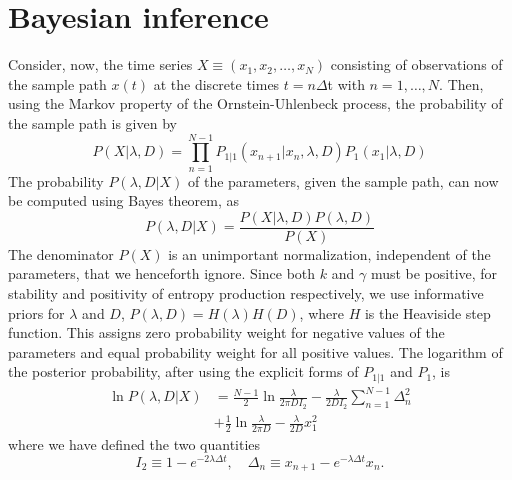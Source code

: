 \documentclass[english,aps, onecolumn, prl,superscriptaddress, notitlepage]{revtex4-1}
\begin{document}
\section{Bayesian inference\label{sec:Bayesian-inference}}

Consider, now, the time series $X\equiv(x_{1},x_{2},\ldots,x_{N})$
consisting of observations of the sample path $x(t)$ at the discrete
times $t=n\Delta$t with $n=1,\ldots,N.$ Then, using the Markov property
of the Ornstein-Uhlenbeck process, the probability of the sample path
is given by \cite{wang1945theory} 
\begin{equation}
P(X|\lambda,D)=\prod_{n=1}^{N-1}P_{1|1}(x_{n+1}|x_{n},\lambda,D)P_{1}(x_{1}|\lambda,D)
\end{equation}
The probability $P(\lambda,D|X)$ of the parameters, given the sample
path, can now be computed using Bayes theorem, as
\[
P(\lambda,D|X)=\frac{P(X|\lambda,D)P(\lambda,D)}{P(X)}
\]
The denominator $P(X)$ is an unimportant normalization, independent
of the parameters, that we henceforth ignore. Since both $k$ and
$\gamma$ must be positive, for stability and positivity of entropy
production respectively, we use informative priors for $\lambda$
and $D$, $P(\lambda,D)=H(\lambda)H(D)$, where $H$ is the Heaviside
step function. This assigns zero probability weight for negative values
of the parameters and equal probability weight for all positive values.
The logarithm of the posterior probability, after using the explicit
forms of $P_{1|1}$ and $P_{1}$, is
\begin{align}
\ln P(\lambda,D|X) & =\frac{N-1}{2}\ln\frac{\lambda}{2\pi DI_{2}}-\frac{\lambda}{2DI_{2}}\sum_{n=1}^{N-1}\Delta_{n}^{2}\nonumber \\
 & +\frac{1}{2}\ln\frac{\lambda}{2\pi D}-\frac{\lambda}{2D}x_{1}^{2}\label{eq:joint-posterior}
\end{align}
where we have defined the two quantities 
\[
I_{2}\equiv1-e^{-2\lambda\Delta t},\quad\Delta_{n}\equiv x_{n+1}-e^{-\lambda\Delta t}x_{n}.
\]
\end{document}
